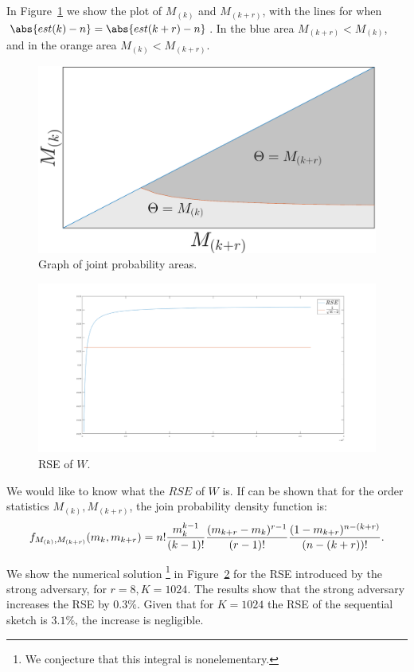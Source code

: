 In Figure~\ref{fig:areaGraph} we show the plot of $M_{(k)}$ and $M_{(k+r)}$, with the lines for when
$\abs{est(k) - n} = \abs{est(k+r) - n}$. In the blue area $M_{(k+r)} < M_{(k)}$, and in
the orange area $M_{(k)} < M_{(k+r)}$.
\begin{figure}[H]
    \centering
    \includegraphics[width=6in]{images/areaGraph.png}
    \caption{Graph of joint probability areas.}
    \label{fig:areaGraph}
\end{figure}
\begin{figure}[H]
    \centering
    \includegraphics[width=6in]{images/strongAdversaryRSE.png}
    \caption{RSE of $W$.}
    \label{fig:strongAdversaryRSE}
\end{figure}

We would like to know what the $RSE$ of $W$ is. If can be shown that for the order statistics 
$M_{(k)}, M_{(k+r)}$, the join probability density function is:
\begin{align*}
f_{M_{(k)},M_{(k+r)}}(m_k,m_{k+r}) = n!{m_k^{k-1}\over (k-1)!}{(m_{k+r}-m_k)^{r-1}\over(r-1)!}{(1-m_{k+r})^{n-(k+r)}\over (n-(k+r))!}.
\end{align*}

We show the numerical solution \footnote{We conjecture that this integral is nonelementary.}
in Figure~\ref{fig:strongAdversaryRSE} for the RSE introduced by the strong adversary,
for $r=8,K=1024$. The results show that the strong adversary increases the RSE by $0.3\%$. Given
that for $K=1024$ the RSE of the sequential sketch is $3.1\%$, the increase is negligible.

